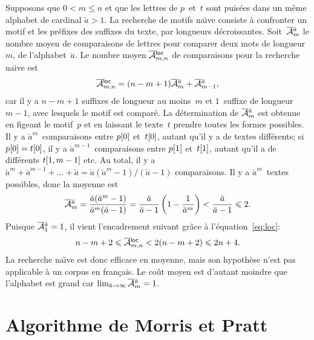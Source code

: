 Supposons que \(0 < m \leqslant n\) et que les lettres de
\(p\)~et~\(t\) sont puisées dans un même alphabet de cardinal
\(\breve{a} > 1\). La recherche de motifs na\"{\i}ve consiste à
confronter un motif et les préfixes des suffixes du texte, par
longueurs décroissantes. Soit~\(\OM{\breve{a}}{m}\)
 le nombre moyen de comparaisons de
lettres pour comparer deux mots de longueur~\(m\), de
l'alphabet~\(\breve{a}\). Le nombre moyen \(\OM{\fun{loc}}{m,n}\) de
comparaisons pour la recherche na\"{\i}ve est
\begin{equation}
\OM{\fun{loc}}{m,n} = (n-m+1)\OM{\breve{a}}{m} + \OM{\breve{a}}{m-1},
\label{eq:loc}
\end{equation}
car il y a \(n-m+1\) suffixes de longueur au moins~\(m\) et
\(1\)~suffixe de longueur~\(m-1\), avec lesquels le motif est comparé.
La détermination de \(\OM{\breve{a}}{m}\) est obtenue en figeant le
motif~\(p\) et en laissant le texte~\(t\) prendre toutes les formes
possibles. Il y a \(\breve{a}^{m}\)~comparaisons entre \({p}[{0}]\)
et~\({t}[{0}]\), autant qu'il y a de textes différents; si
\({p}[{0}]={t}[{0}]\), il y a \(\breve{a}^{m-1}\)~comparaisons
entre \({p}[{1}]\) et~\({t}[{1}]\), autant qu'il a de différents
\({t}[{1,m-1}]\) etc. Au total, il y a \(\breve{a}^{m} +
\breve{a}^{m-1} + \dots + \breve{a} = \breve{a}(\breve{a}^{m} -
1)/(\breve{a}-1)\) comparaisons. Il y a \(\breve{a}^m\)~textes
possibles, donc la moyenne est
\begin{equation*}
\OM{\breve{a}}{m}
 = \frac{\breve{a}(\breve{a}^{m}-1)}{\breve{a}^m(\breve{a}-1)}
 = \frac{\breve{a}}{\breve{a}-1}\left(1
                          - \frac{1}{\breve{a}^{m}}\right)
 < \frac{\breve{a}}{\breve{a}-1}
 \leqslant 2.
\end{equation*}
Puisque \(\OM{\breve{a}}{1} = 1\), il vient l'encadrement suivant
grâce à l'équation~\eqref{eq:loc}:
\begin{equation*}
n - m + 2 \leqslant \OM{\fun{loc}}{m,n} < 2(n-m+2) \leqslant 2n + 4.
\end{equation*}
La recherche na\"{\i}ve est donc efficace en moyenne, mais son
hypothèse n'est pas applicable à un corpus en français. Le coût moyen
est d'autant moindre que l'alphabet est grand car \(\lim_{\breve{a}
  \rightarrow \infty}\OM{\breve{a}}{m} = 1\). 


\section{Algorithme de Morris et Pratt}

